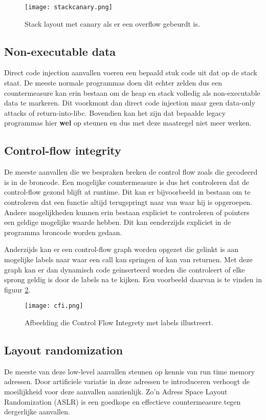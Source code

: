 \documentclass[../main.tex]{subfiles}
\begin{document}
\begin{figure}
\centering
\texttt{[image: stackcanary.png]}
\caption{Stack layout met canary als er een overflow gebeurdt is.}
\label{f:stackcanary}
\end{figure}

\subsection{Non-executable data}
Direct code injection aanvallen voeren een bepaald stuk code uit dat op de stack staat.
De meeste normale programmas doen dit echter zelden dus een countermeasure kan erin bestaan om de heap en stack volledig als non-executable data te markeren.
Dit voorkmont dan direct code injection maar geen data-only attacks of return-into-libc.
Bovendien kan het zijn dat bepaalde legacy programmas hier \textbf{wel} op steunen en dus met deze maatregel niet meer werken.

\subsection{Control-flow integrity}
De meeste aanvallen die we bespraken breken de control flow zoals die gecodeerd is in de broncode.
Een mogelijke countermeasure is dus het controleren dat de control-flow gezond blijft at runtime.
Dit kan er bijvoorbeeld in bestaan om te controleren dat een functie altijd terugspringt naar van waar hij is opgeroepen.
Andere mogelijkheden kunnen erin bestaan expliciet te controleren of pointers een geldige mogelijke waarde hebben.
Dit kan eenderzijds expliciet in de programma broncode worden gedaan.

Anderzijds kan er een control-flow graph worden opgezet die gelinkt is aan mogelijke labels naar waar een call kan springen of kan van returnen.
Met deze graph kan er dan dynamisch code geinserteerd worden die controleert of elke sprong geldig is door de labels na te kijken.
Een voorbeeld daarvan is te vinden in figuur \ref{f:cfi}.

\begin{figure}
\centering
\texttt{[image: cfi.png]}
\caption{Afbeelding die Control Flow Integrety met labels illustreert.}
\label{f:cfi}
\end{figure}

\subsection{Layout randomization}
De meeste van deze low-level aanvallen steunen op kennis van run time memory adressen.
Door artificiele variatie in deze adressen te introduceren verhoogt de moeilijkheid voor deze aanvallen aanzienlijk.
Zo'n Adress Space Layout Randomization (ASLR) is een goedkope en effectieve countermeasure tegen dergerlijke aanvallen.
\end{document}

